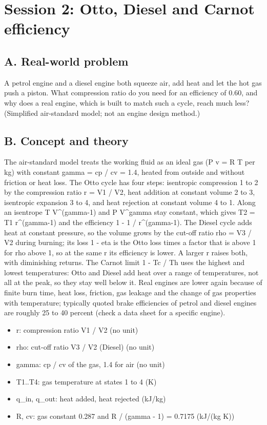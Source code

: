 \documentclass[11pt,a4paper]{article}
\begin{document}
\section{Session 2: Otto, Diesel and Carnot efficiency}

\subsection*{A. Real-world problem}
A petrol engine and a diesel engine both squeeze air, add heat and let the hot gas push a piston. What compression ratio do you need for an efficiency of 0.60, and why does a real engine, which is built to match such a cycle, reach much less? (Simplified air-standard model; not an engine design method.)

\subsection*{B. Concept and theory}
The air-standard model treats the working fluid as an ideal gas (P v = R T per kg) with constant gamma = cp / cv = 1.4, heated from outside and without friction or heat loss. The Otto cycle has four steps: isentropic compression 1 to 2 by the compression ratio r = V1 / V2, heat addition at constant volume 2 to 3, isentropic expansion 3 to 4, and heat rejection at constant volume 4 to 1. Along an isentrope T V\textasciicircum{}(gamma-1) and P V\textasciicircum{}gamma stay constant, which gives T2 = T1 r\textasciicircum{}(gamma-1) and the efficiency 1 - 1 / r\textasciicircum{}(gamma-1). The Diesel cycle adds heat at constant pressure, so the volume grows by the cut-off ratio rho = V3 / V2 during burning; its loss 1 - eta is the Otto loss times a factor that is above 1 for rho above 1, so at the same r its efficiency is lower. A larger r raises both, with diminishing returns. The Carnot limit 1 - Tc / Th uses the highest and lowest temperatures: Otto and Diesel add heat over a range of temperatures, not all at the peak, so they stay well below it. Real engines are lower again because of finite burn time, heat loss, friction, gas leakage and the change of gas properties with temperature; typically quoted brake efficiencies of petrol and diesel engines are roughly 25 to 40 percent (check a data sheet for a specific engine).

\begin{itemize}[nosep]
\item r: compression ratio V1 / V2 (no unit)
\item rho: cut-off ratio V3 / V2 (Diesel) (no unit)
\item gamma: cp / cv of the gas, 1.4 for air (no unit)
\item T1..T4: gas temperature at states 1 to 4 (K)
\item q\_in, q\_out: heat added, heat rejected (kJ/kg)
\item R, cv: gas constant 0.287 and R / (gamma - 1) = 0.7175 (kJ/(kg K))
\end{itemize}
\end{document}
